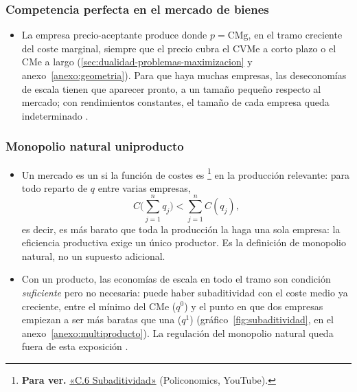 \documentclass[11pt]{article}
\begin{document}
\subsubsection{Competencia perfecta en el mercado de bienes}\label{sec:competencia-perfecta-mercado}

\begin{itemize}
\item La empresa precio-aceptante produce donde $p=\mathrm{CMg}$, en el tramo creciente del coste marginal, siempre que el precio cubra el CVMe a corto plazo o el CMe a largo (\ref{sec:dualidad-problemas-maximizacion} y anexo~\ref{anexo:geometria}). Para que haya muchas empresas, las deseconomías de escala tienen que aparecer pronto, a un tamaño pequeño respecto al mercado; con rendimientos constantes, el tamaño de cada empresa queda indeterminado .
\end{itemize}

\subsubsection{Monopolio natural uniproducto}\label{sec:monopolio-natural-uniproducto}

\begin{itemize}
\item Un mercado es un  si la función de costes es \footnote{\textbf{Para ver.} \href{https://www.youtube.com/watch?v=zguAhXFX6QM}{«C.6 Subaditividad»} (Policonomics, YouTube).} en la producción relevante: para todo reparto de $q$ entre varias empresas,
  \begin{equation}
  C\Big(\sum_{j=1}^{n}q_j\Big)<\sum_{j=1}^{n}C(q_j), \label{eq:subaditividad}
  \end{equation}
  es decir, es más barato que toda la producción la haga una sola empresa: la eficiencia productiva exige un único productor. Es la definición de monopolio natural, no un supuesto adicional\nocite{Baumol1977Proper}.
\item Con un producto, las economías de escala en todo el tramo son condición \emph{suficiente} pero no necesaria: puede haber subaditividad con el coste medio ya creciente, entre el mínimo del CMe ($q^0$) y el punto en que dos empresas empiezan a ser más baratas que una ($q^1$) (gráfico~\ref{fig:subaditividad}, en el anexo~\ref{anexo:multiproducto}). La regulación del monopolio natural queda fuera de esta exposición  .
\end{itemize}
\end{document}
